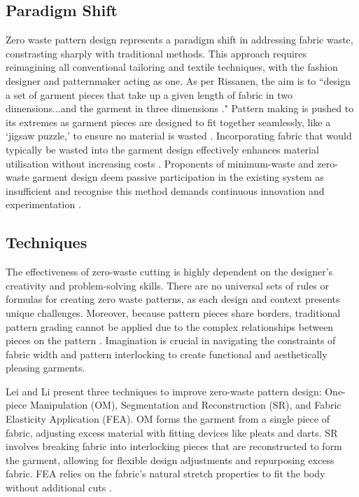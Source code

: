 \subsection{Paradigm Shift}
Zero waste pattern design represents a paradigm shift in addressing fabric waste, constrasting sharply with traditional methods. This approach requires reimagining all conventional tailoring and textile techniques, with the fashion designer and patternmaker acting as one. As per Rissanen, the aim is to ``design a set of garment pieces that take up a given length of fabric in two dimensions...and the garment in three dimensions \cite{fletcher_fashion_2012}." Pattern making is pushed to its extremes as garment pieces are designed to fit together seamlessly, like a `jigsaw puzzle,' to ensure no material is wasted \cite{fletcher_fashion_2012,fletcher_sustainable_2014,black_sustainable_2013,rissanen_zero-waste_2013,mcquillan_zero_2020}. Incorporating fabric that would typically be wasted into the garment design effectively enhances material utilisation without increasing costs \cite{fletcher_sustainable_2014}. Proponents of minimum-waste and zero-waste garment design deem passive participation in the existing system as insufficient and recognise this method demands continuous innovation and experimentation \cite{black_sustainable_2013}.

\subsection{Techniques}
The effectiveness of zero-waste cutting is highly dependent on the designer's creativity and problem-solving skills. There are no universal sets of rules or formulas for creating zero waste patterns, as each design and context presents unique challenges. Moreover, because pattern pieces share borders, traditional pattern grading cannot be applied due to the complex relationships between pieces on the pattern \cite{carrico_inquiry_2022}. Imagination is crucial in navigating the constraints of fabric width and pattern interlocking to create functional and aesthetically pleasing garments.

Lei and Li present three techniques to improve zero-waste pattern design: One-piece Manipulation (OM), Segmentation and Reconstruction (SR), and Fabric Elasticity Application (FEA). OM forms the garment from a single piece of fabric, adjusting excess material with fitting devices like pleats and darts. SR involves breaking fabric into interlocking pieces that are reconstructed to form the garment, allowing for flexible design adjustments and repurposing excess fabric. FEA relies on the fabric's natural stretch properties to fit the body without additional cuts \cite{lei_pattern_2021}.

